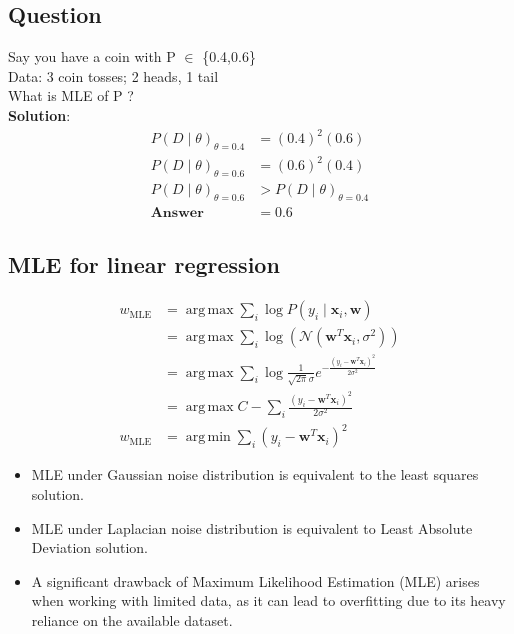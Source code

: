 \documentclass{report}
\newcommand{\w}{\mathbf{w}} %
\newcommand{\x}{\mathbf{x}}
\DeclareMathOperator*{\argmax}{arg\,max}
\DeclareMathOperator*{\argmin}{arg\,min}
\begin{document}
\subsection{Question}
Say you have a coin with P $\in$ \{0.4,0.6\} \\
Data: 3 coin tosses; 2 heads, 1 tail \\
What is MLE of P ? \\

\textbf{Solution}:
\begin{align*}
  P(D\mid\theta)_{\theta = 0.4} & = (0.4)^2 (0.6)                 \\
  P(D\mid\theta)_{\theta = 0.6} & = (0.6)^2 (0.4)                 \\
  P(D\mid\theta)_{\theta = 0.6} & > P(D\mid\theta)_{\theta = 0.4} \\
  \textbf{Answer}               & = 0.6
\end{align*}

\subsection{MLE for linear regression}
\begin{align*}
  w_{\text{MLE}} & = \argmax \sum_i \log P(y_i \mid \x_i, \w)                                                  \\
                 & = \argmax \sum_i \log ( \mathcal{N}(\w^T\x_i, \sigma^2))                                    \\
                 & = \argmax \sum_i \log \frac{1}{\sqrt{2\pi}\sigma} e^{-\frac{(y_i - \w^T\x_i)^2}{2\sigma^2}} \\
                 & = \argmax C - \sum_i {\frac{(y_i - \w^T\x_i)^2}{2\sigma^2}}                                 \\
  w_{\text{MLE}} & = \argmin \sum_i {(y_i - \w^T\x_i)^2}
\end{align*}

\begin{itemize}
  \item MLE under Gaussian noise distribution is equivalent to the least squares solution.
  \item MLE under Laplacian noise distribution is equivalent to Least Absolute Deviation solution.
  \item A significant drawback of Maximum Likelihood Estimation (MLE) arises when working with limited data, as it can lead to overfitting due to its heavy reliance on the available dataset.
\end{itemize}
\end{document}
